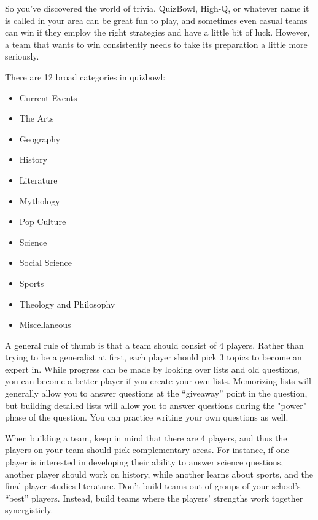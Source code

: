 So you've discovered the world of trivia. QuizBowl, High-Q, or whatever name it is called in your area can be great fun to play, and sometimes even casual teams can win if they employ the right strategies and have a little bit of luck.  However, a team that wants to win consistently needs to take its preparation a little more seriously.  

There are 12 broad categories in quizbowl:
\begin{multicols}{2}
\begin{itemize}
	\item Current Events
	\item The Arts
	\item Geography
	\item History
	\item Literature
	\item Mythology
	\item Pop Culture
	\item Science
	\item Social Science
	\item Sports
	\item Theology and Philosophy
	\item Miscellaneous
\end{itemize}
\end{multicols}
A general rule of thumb is that a team should consist of 4 players.  Rather than trying to be a generalist at first, each player should pick 3 topics to become an expert in.  While progress can be made by looking over lists and old questions, you can become a better player if you create your own lists.   Memorizing lists will generally allow you to answer questions at the ``giveaway'' point in the question, but building detailed lists will allow you to answer questions during the "power" phase of the question.  You can practice writing your own questions as well.  

When building a team, keep in mind that there are 4 players, and thus the players on your team should pick complementary areas.  For instance, if one player is interested in developing their ability to answer science questions, another player should work on history, while another learns about sports, and the final player studies literature.  Don't build teams out of groups of your school's ``best'' players.  Instead, build teams where the players' strengths work together synergisticly. 
